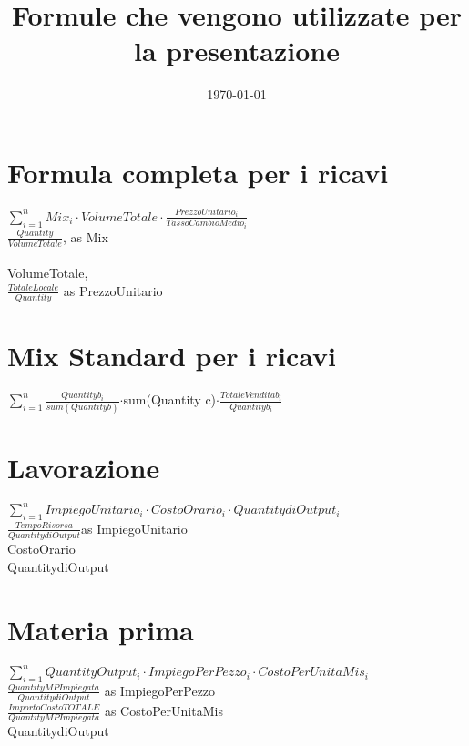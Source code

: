 \documentclass[14pt]{extarticle}
\title{Formule che vengono utilizzate per la presentazione}
\date{\today}
\begin{document}
\maketitle
\section{Formula completa per i ricavi}
$\sum_{i=1} ^{n} Mix_{i}\cdot VolumeTotale \cdot $$\frac{PrezzoUnitario_{i}}{TassoCambioMedio_{i}}$
\\$\frac{Quantity}{VolumeTotale}$, as Mix\\
\bigskip
\\VolumeTotale, 
\bigskip
\\$\frac{TotaleLocale}{Quantity}$ as PrezzoUnitario

\section{Mix Standard per i ricavi}
$\sum_{i=1} ^{n}$$\frac{Quantityb_{i}}{sum(Quantity b)}$$\cdot$sum(Quantity c)$\cdot$$\frac{Totale Vendita b_{i}}{Quantity b_{i}}$

\section{Lavorazione}
$\sum_{i=1} ^{n} ImpiegoUnitario_i \cdot CostoOrario_i \cdot QuantitydiOutput_i$
\bigskip
\\$\frac{TempoRisorsa}{QuantitydiOutput}$as ImpiegoUnitario
\bigskip
\bigskip
\\CostoOrario
\bigskip
\bigskip
\\QuantitydiOutput

\section{Materia prima}
$\sum_{i=1} ^{n}QuantityOutput_i \cdot ImpiegoPerPezzo_i\cdot CostoPerUnitaMis_i$
\bigskip
\\$\frac{QuantityMPImpiegata}{QuantitydiOutput}$ as ImpiegoPerPezzo
\bigskip
\bigskip
\\$\frac {ImportoCostoTOTALE}{QuantityMPImpiegata}$ as CostoPerUnitaMis
\bigskip
\bigskip
\\QuantitydiOutput
\end{document}
